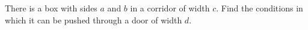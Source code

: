 There is a box with sides $a$ and $b$ in a corridor of width $c$. Find the conditions in which it can be pushed through a door of width $d$.
